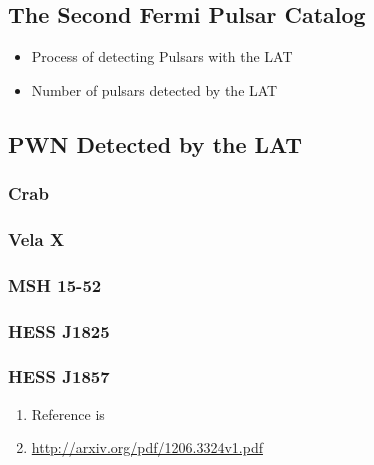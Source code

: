 \subsection{The Second Fermi Pulsar Catalog}

\begin{itemize}
  \item Process of detecting Pulsars with the LAT
  \item Number of pulsars detected by the LAT
\end{itemize}

\subsection{PWN Detected by the LAT}

\subsubsection{Crab}

\subsubsection{Vela X}

\subsubsection{MSH 15-52}

\subsubsection{HESS J1825}

\subsubsection{HESS J1857}


\begin{enumerate}
  \item Reference is \cite{hess_j1857_lat_2012}
  \item \url{http://arxiv.org/pdf/1206.3324v1.pdf}
\end{enumerate}

